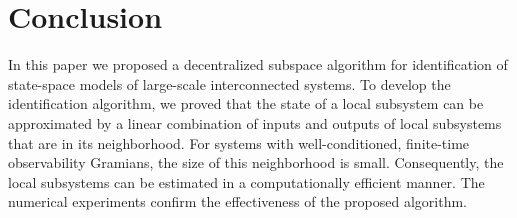 \documentclass[journal,10pt]{IEEEtran}
\begin{document}
\section{Conclusion}
\label{sectionConclusion}
In this paper we proposed a decentralized subspace algorithm for identification of state-space models of large-scale interconnected systems. To develop the identification algorithm, we proved that the state of a local subsystem can be approximated by a linear combination of inputs and outputs of local subsystems that are in its neighborhood. For systems with well-conditioned, finite-time observability Gramians, the size of this neighborhood is small. Consequently, the local subsystems can be estimated in a computationally efficient manner. The numerical experiments confirm the effectiveness of the proposed algorithm. 


\end{document}
